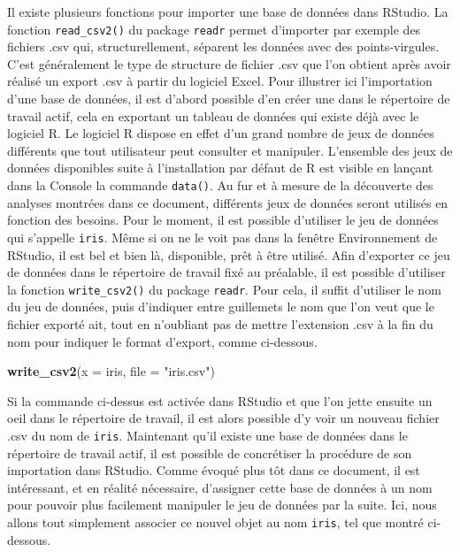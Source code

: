 \documentclass[
  french,
]{book}
\newenvironment{Shaded}{\begin{snugshade}}{\end{snugshade}}
\newcommand{\DataTypeTok}[1]{\textcolor[rgb]{0.13,0.29,0.53}{#1}}
\newcommand{\KeywordTok}[1]{\textcolor[rgb]{0.13,0.29,0.53}{\textbf{#1}}}
\newcommand{\NormalTok}[1]{#1}
\newcommand{\StringTok}[1]{\textcolor[rgb]{0.31,0.60,0.02}{#1}}
\begin{document}
Il existe plusieurs fonctions pour importer une base de données dans RStudio. La fonction \texttt{read\_csv2()} du package \texttt{readr} permet d'importer par exemple des fichiers .csv qui, structurellement, séparent les données avec des points-virgules. C'est généralement le type de structure de fichier .csv que l'on obtient après avoir réalisé un export .csv à partir du logiciel Excel. Pour illustrer ici l'importation d'une base de données, il est d'abord possible d'en créer une dans le répertoire de travail actif, cela en exportant un tableau de données qui existe déjà avec le logiciel R. Le logiciel R dispose en effet d'un grand nombre de jeux de données différents que tout utilisateur peut consulter et manipuler. L'ensemble des jeux de données disponibles suite à l'installation par défaut de R est visible en lançant dans la Console la commande \texttt{data()}. Au fur et à mesure de la découverte des analyses montrées dans ce document, différents jeux de données seront utilisés en fonction des besoins. Pour le moment, il est possible d'utiliser le jeu de données qui s'appelle \texttt{iris}. Même si on ne le voit pas dans la fenêtre Environnement de RStudio, il est bel et bien là, disponible, prêt à être utilisé. Afin d'exporter ce jeu de données dans le répertoire de travail fixé au préalable, il est possible d'utiliser la fonction \texttt{write\_csv2()} du package \texttt{readr}. Pour cela, il suffit d'utiliser le nom du jeu de données, puis d'indiquer entre guillemets le nom que l'on veut que le fichier exporté ait, tout en n'oubliant pas de mettre l'extension .csv à la fin du nom pour indiquer le format d'export, comme ci-dessous.

\begin{Shaded}
\begin{Highlighting}[]
\KeywordTok{write_csv2}\NormalTok{(}\DataTypeTok{x =}\NormalTok{ iris, }\DataTypeTok{file =} \StringTok{"iris.csv"}\NormalTok{)}
\end{Highlighting}
\end{Shaded}

Si la commande ci-dessus est activée dans RStudio et que l'on jette ensuite un oeil dans le répertoire de travail, il est alors possible d'y voir un nouveau fichier .csv du nom de \texttt{iris}. Maintenant qu'il existe une base de données dans le répertoire de travail actif, il est possible de concrétiser la procédure de son importation dans RStudio. Comme évoqué plus tôt dans ce document, il est intéressant, et en réalité nécessaire, d'assigner cette base de données à un nom pour pouvoir plus facilement manipuler le jeu de données par la suite. Ici, nous allons tout simplement associer ce nouvel objet au nom \texttt{iris}, tel que montré ci-dessous.
\end{document}
